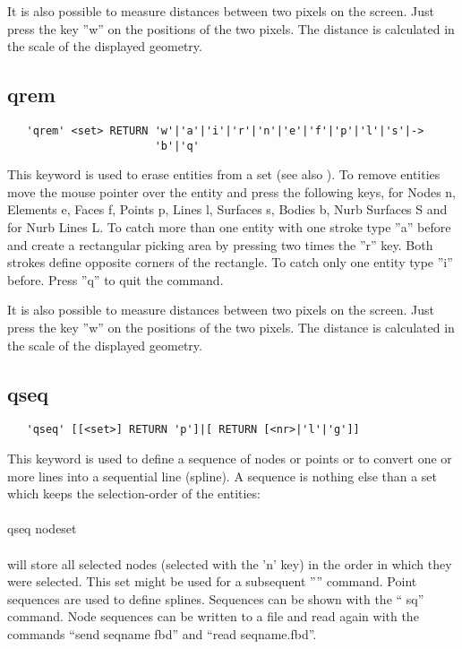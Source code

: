 \documentclass{article}
\begin{document}
It is also possible to measure distances between two pixels on the screen. Just press the key ''w'' on the positions of the two pixels. The distance is calculated in the scale of the displayed geometry.  

\subsection{\label{qrem}qrem}
\begin{verbatim}
   'qrem' <set> RETURN 'w'|'a'|'i'|'r'|'n'|'e'|'f'|'p'|'l'|'s'|->
                       'b'|'q' 
\end{verbatim}
This keyword is used to erase entities from a set (see also ). To remove entities move the mouse pointer over the entity and press the following keys, for Nodes n, Elements e, Faces f, Points p, Lines l, Surfaces s, Bodies b, Nurb Surfaces S and for Nurb Lines L. To catch more than one entity with one stroke type ''a'' before and create a rectangular picking area by pressing two times the ''r'' key. Both strokes define opposite corners of the rectangle. To catch only one entity type ''i'' before. Press ''q'' to quit the command. 

It is also possible to measure distances between two pixels on the screen. Just press the key ''w'' on the positions of the two pixels. The distance is calculated in the scale of the displayed geometry.

\subsection{\label{qseq}qseq}
\begin{verbatim}
   'qseq' [[<set>] RETURN 'p']|[ RETURN [<nr>|'l'|'g']] 
\end{verbatim}
This keyword is used to define a sequence of nodes or points or to convert one or more lines into a sequential line (spline). A sequence is nothing else than a set which keeps the selection-order of the entities:\\\\qseq nodeset\\\\will store all selected nodes (selected with the 'n' key) in the order in which they were selected. This set might be used for a subsequent '''' command. Point sequences are used to define splines. Sequences can be shown with the `` sq'' command. Node sequences can be written to a file and read again with the commands ``send seqname fbd'' and ``read seqname.fbd''.
\end{document}
